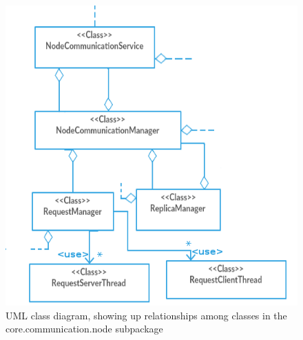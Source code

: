 \documentclass{article}
\begin{document}
\begin{figure}[h]
\centering
\includegraphics[scale=0.40]{core_communication_node}
\caption{UML class diagram, showing up relationships among classes in the core.communication.node subpackage}
\label{fig:class_diag_core.communication.node	}
\end{figure}
\end{document}
